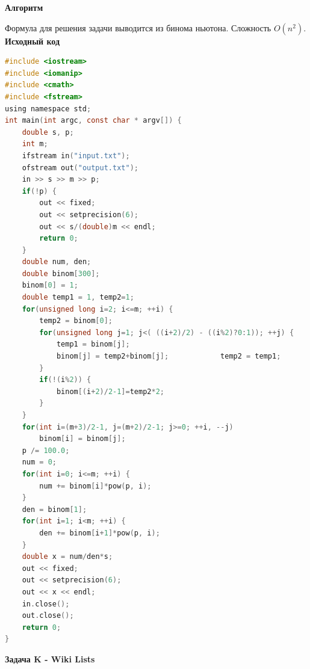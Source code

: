\documentclass[a4paper,12pt]{article}
\begin{document}
\textbf{{\large Алгоритм}}

Формула для решения задачи выводится из бинома ньютона. Сложность $O(n^2)$. \\

\newpage
\textbf{{\large Исходный код}} \\
\begin{lstlisting}[language=C]
#include <iostream>
#include <iomanip>
#include <cmath>
#include <fstream>
using namespace std;
int main(int argc, const char * argv[]) {
    double s, p;
    int m;
    ifstream in("input.txt");
    ofstream out("output.txt");
    in >> s >> m >> p;
    if(!p) {
        out << fixed;
        out << setprecision(6);
        out << s/(double)m << endl;
        return 0;
    }
    double num, den;
    double binom[300];
    binom[0] = 1;
    double temp1 = 1, temp2=1;
    for(unsigned long i=2; i<=m; ++i) {
        temp2 = binom[0];
        for(unsigned long j=1; j<( ((i+2)/2) - ((i%2)?0:1)); ++j) {
            temp1 = binom[j];
            binom[j] = temp2+binom[j];            temp2 = temp1;
        }
        if(!(i%2)) {
            binom[(i+2)/2-1]=temp2*2;
        }
    }
    for(int i=(m+3)/2-1, j=(m+2)/2-1; j>=0; ++i, --j)
        binom[i] = binom[j];
    p /= 100.0;
    num = 0;
    for(int i=0; i<=m; ++i) {
        num += binom[i]*pow(p, i);
    }
    den = binom[1];
    for(int i=1; i<m; ++i) {
        den += binom[i+1]*pow(p, i);
    }
    double x = num/den*s;
    out << fixed;
    out << setprecision(6);
    out << x << endl;
    in.close();
    out.close();
    return 0;
}
\end{lstlisting}

\newpage
\textbf{{\large Задача K - Wiki Lists}}
\end{document}
